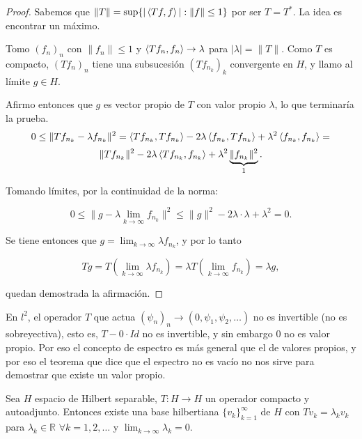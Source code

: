 \begin{proof}
  Sabemos que $\|T\|=\sup \{|\left\langle Tf,f\right\rangle|:\|f\|\le 1\}$ por ser $T=T^*$. La
  idea es encontrar un máximo.

  Tomo $(f_n)_n$ con $\|f_n\|\le 1$ y $\left\langle Tf_n,f_n\right\rangle\to \lambda$ para
  $|\lambda|=\|T\|$. Como $T$ es compacto, $(Tf_n)_n$ tiene una subsucesión
  $(Tf_{n_k})_k$ convergente en $H$, y llamo al límite $g\in H$.

  Afirmo entonces que $g$ es vector propio de $T$ con valor propio $\lambda$, lo
  que terminaría la prueba.
  \[
  0\le \|Tf_{n_k}-\lambda f_{n_k}\|^2 =
  \left\langle Tf_{n_k},Tf_{n_k}\right\rangle-2\lambda\left\langle f_{n_k},Tf_{n_k}\right\rangle+\lambda^2
  \left\langle f_{n_k},f_{n_k}\right\rangle=
  \] 
  \[
  \|Tf_{n_k}\|^2-2\lambda\left\langle Tf_{n_k},f_{n_k}\right\rangle + \lambda^2
  \underbrace{\|f_{n_k}\|^2}_{1}
  .\] 

  Tomando límites, por la continuidad de la norma:

  \[
  0\le \|g-\lambda \lim_{k \to \infty} f_{n_k}\|^2 \le 
  \|g\|^2-2\lambda\cdot \lambda + \lambda^2=0
  .\] 
  
  Se tiene entonces que $g=\lim_{k \to \infty} \lambda f_{n_k}$, y por lo tanto

  \[
  Tg = T(\lim_{k \to \infty} \lambda f_{n_k})=\lambda T(\lim_{k \to \infty}
  f_{n_k})=\lambda g
  ,\] 

  quedan demostrada la afirmación.

\end{proof}

\begin{remark}
  En $l^2$, el operador $T$ que actua $(\psi_n)_n\to (0,\psi_1,\psi_2,\ldots)$
  no es invertible (no es sobreyectiva), esto es, $T-0\cdot Id$ no es
  invertible, y sin embargo $0$ no es valor propio. Por eso el concepto de
  espectro es más general que el de valores propios, y por eso el teorema que
  dice que el espectro no es vacío no nos sirve para demostrar que existe un
  valor propio.
\end{remark}

\begin{theorem}
  Sea $H$ espacio de Hilbert separable, $T:H\to H$ un operador compacto y
  autoadjunto. Entonces existe una base hilbertiana $\{v_k\}_{k=1}^\infty$ de $H$ 
  con $Tv_k=\lambda_k v_k$ para $\lambda_k\in \mathbb{R}$ $\forall k=1,2,\ldots$ y
  $\lim_{k \to \infty} \lambda_k=0$.
\end{theorem}

